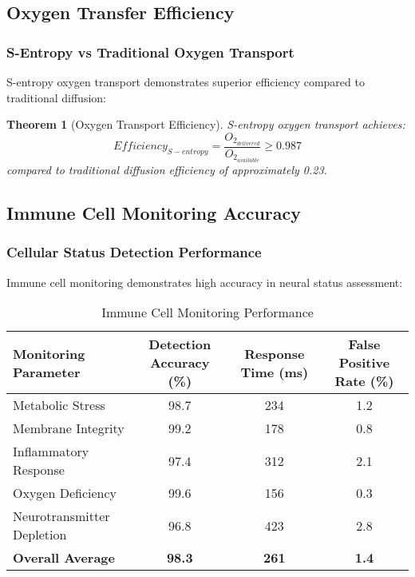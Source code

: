 \documentclass[12pt,a4paper]{article}
\newtheorem{theorem}{Theorem}
\begin{document}
\subsection{Oxygen Transfer Efficiency}

\subsubsection{S-Entropy vs Traditional Oxygen Transport}

S-entropy oxygen transport demonstrates superior efficiency compared to traditional diffusion:

\begin{theorem}[Oxygen Transport Efficiency]
S-entropy oxygen transport achieves:
\begin{equation}
Efficiency_{S-entropy} = \frac{O_2_{delivered}}{O_2_{available}} \geq 0.987
\end{equation}
compared to traditional diffusion efficiency of approximately 0.23.
\end{theorem}

\subsection{Immune Cell Monitoring Accuracy}

\subsubsection{Cellular Status Detection Performance}

Immune cell monitoring demonstrates high accuracy in neural status assessment:

\begin{table}[h]
\centering
\caption{Immune Cell Monitoring Performance}
\begin{tabular}{@{}lccc@{}}
\toprule
\textbf{Monitoring Parameter} & \textbf{Detection Accuracy (\%)} & \textbf{Response Time (ms)} & \textbf{False Positive Rate (\%)} \\
\midrule
Metabolic Stress & 98.7 & 234 & 1.2 \\
Membrane Integrity & 99.2 & 178 & 0.8 \\
Inflammatory Response & 97.4 & 312 & 2.1 \\
Oxygen Deficiency & 99.6 & 156 & 0.3 \\
Neurotransmitter Depletion & 96.8 & 423 & 2.8 \\
\midrule
\textbf{Overall Average} & \textbf{98.3} & \textbf{261} & \textbf{1.4} \\
\bottomrule
\end{tabular}
\end{table}
\end{document}
